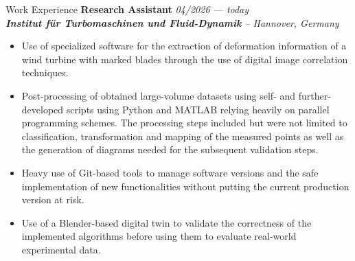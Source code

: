 \documentclass[a4paper]{resume} %
\begin{document}
    \begin{rSection}{Work Experience}
   		{\bf Research Assistant} \hfill{\itshape 04/2026 --- today} 
   		\\{\textit{\textbf{Institut für Turbomaschinen und Fluid-Dynamik} -- Hannover, Germany}}
   		\begin{itemize}
   			\item Use of specialized software for the extraction of deformation information of a wind turbine with marked blades through the use of digital image correlation techniques.
   			\item Post-processing of obtained large-volume datasets using self- and further-developed scripts using Python and MATLAB relying heavily on parallel programming schemes. The processing steps included but were not limited to classification, transformation and mapping of the measured points as well as the generation of diagrams needed for the subsequent validation steps.
   			\item Heavy use of Git-based tools to manage software versions and the safe implementation of new functionalities without putting the current production version at risk.
   			\item Use of a Blender-based digital twin to validate the correctness of the implemented algorithms before using them to evaluate real-world experimental data.
   			
   		\end{itemize}
   		
    	
    	

\end{rSection}
\end{document}
